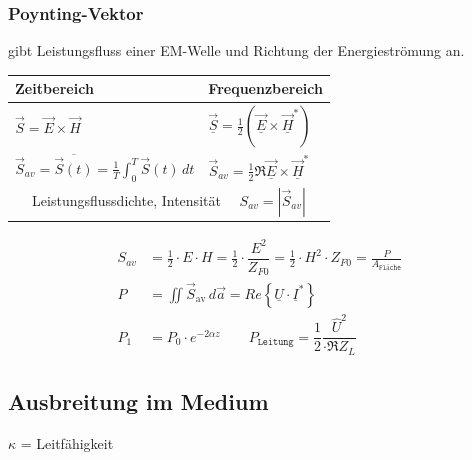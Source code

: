 \subsubsection{Poynting-Vektor}
gibt Leistungsfluss einer EM-Welle und Richtung der Energieströmung an.\\
\begin{tabular}{|l|l|}
	\hline
	Zeitbereich & Frequenzbereich\\
	\hline
	$\vec{S} = \vec{E} \times \vec{H}$ & $\vec{\underline{S}} = \frac{1}{2} (\underline{\vec{E}} \times \underline{\vec{H}}^*)$ \\
	$\vec{S}_{av} = \overline{\vec{S}(t)} = \frac{1}{T} \int_{0}^{T} \vec{S}(t) \,dt $ & $\vec{S}_{av} = \frac{1}{2} \Re{\underline{\vec{E}} \times \underline{\vec{H}}^*}$\\
	\hline
	\multicolumn{2}{|c|}{Leistungsflussdichte, Intensität $\quad S_{av} = |\vec{S}_{av}|$}\\
	\hline
\end{tabular}
\begin{align*}
	S_{av}              & =  \frac{1}{2} \cdot E \cdot H 
	=  \frac{1}{2} \cdot \dfrac{E^2}{Z_{F0}}            
	=  \frac{1}{2} \cdot H^2 \cdot Z_{F0} 
	=  \frac{P}{A_\texttt{Fläche}}\\
	P &= \iint\vec{S}_{\text{av}}\, d\vec{a}                
	= Re\left\{\underline{U}\cdot\underline{I}^*\right\}\\
	P_1 & = P_0 \cdot e^{-2\alpha z} \qquad P_{\texttt{Leitung}} = \dfrac{1}{2} \dfrac{\hat{U}^2}{\cdot \Re{Z_L}}
\end{align*}
\newcolumn
\subsection{Ausbreitung im Medium}
$ \kappa $ = Leitfähigkeit
